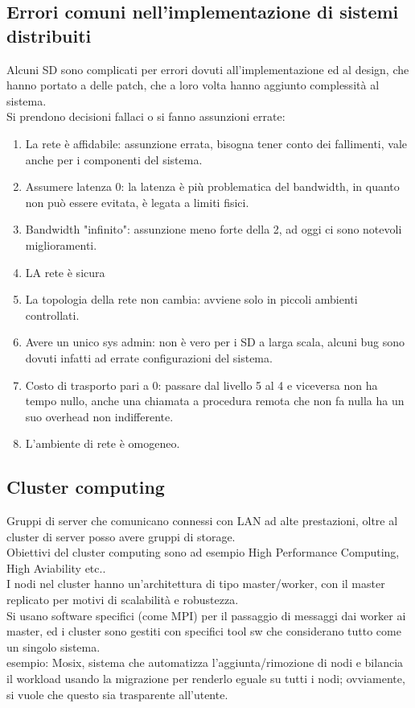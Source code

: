 \documentclass{article}
\begin{document}
\subsection{Errori comuni nell'implementazione di sistemi distribuiti}
Alcuni SD sono complicati per errori dovuti all'implementazione ed al design, che hanno portato a delle patch, che a loro volta hanno aggiunto complessità al sistema.\\ Si prendono decisioni fallaci o si fanno assunzioni errate:
\begin{enumerate}
\item La rete è affidabile: assunzione errata, bisogna tener conto dei fallimenti, vale anche per i componenti del sistema.
\item Assumere latenza 0: la latenza è più problematica del bandwidth, in quanto non può essere evitata, è legata a limiti fisici.
\item Bandwidth "infinito": assunzione meno forte della 2, ad oggi ci sono notevoli miglioramenti.
\item LA rete è sicura
\item La topologia della rete non cambia: avviene solo in piccoli ambienti controllati.
\item Avere un unico sys admin: non è vero per i SD a larga scala, alcuni bug sono dovuti infatti ad errate configurazioni del sistema.
\item Costo di trasporto pari a 0: passare dal livello 5 al 4 e viceversa non ha tempo nullo, anche una chiamata a procedura remota che non fa nulla ha un suo overhead non indifferente.
\item L'ambiente di rete è omogeneo.
\end{enumerate}
\subsection{Cluster computing}
Gruppi di server che comunicano connessi con LAN ad alte prestazioni, oltre al cluster di server posso avere gruppi di storage.\\ Obiettivi del cluster computing sono ad esempio High Performance Computing, High Aviability etc..\\ I nodi nel cluster hanno un'architettura di tipo master/worker, con il master replicato per motivi di scalabilità e robustezza.\\ Si usano software specifici (come MPI) per il passaggio di messaggi dai worker ai master, ed i cluster sono gestiti con specifici tool sw che considerano tutto come un singolo sistema.\\ esempio: Mosix, sistema che automatizza l'aggiunta/rimozione di nodi e bilancia il workload usando la migrazione per renderlo eguale su tutti i nodi; ovviamente, si vuole che questo sia trasparente all'utente.
\end{document}
